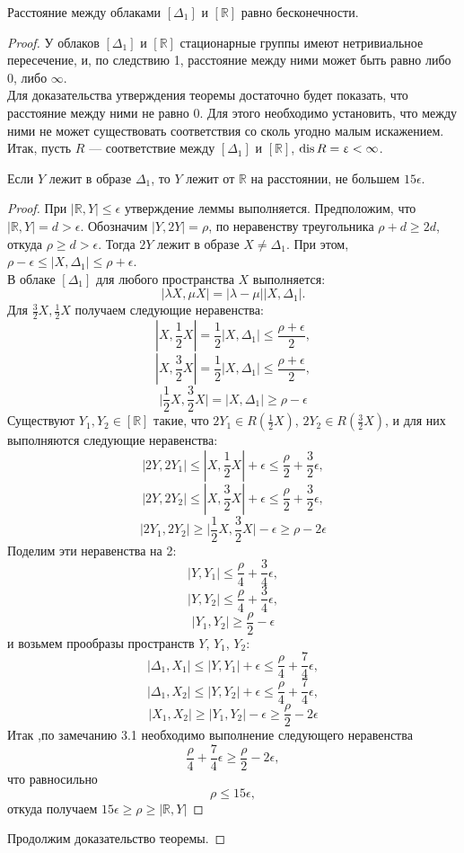 \begin{theorem}
	Расстояние между облаками $[\Delta_1]$ и $[\mathbb{R}]$ равно бесконечности.
\end{theorem} 
\begin{proof}
	У облаков $[\Delta_1]$ и $[\mathbb{R}]$ стационарные группы имеют нетривиальное пересечение, и, по следствию 1, расстояние между ними может быть равно либо $0$, либо $\infty$. \\
	Для доказательства утверждения теоремы достаточно будет показать, что расстояние между ними не равно $0$.
	Для этого необходимо установить, что между ними не может существовать соответствия со сколь угодно малым искажением. Итак, пусть $R$ --- соответствие между $[\Delta_1]$ и $[\mathbb{R}]$, $\operatorname{dis} R = \upvarepsilon < \infty$.
	
	\begin{lemma}
		Если $Y$ лежит в образе $\Delta_1$, то $Y$ лежит от $\mathbb{R} $ на расстоянии, не большем $15\epsilon$.
	\end{lemma}
	\begin{proof}
		При $|\mathbb{R}, Y| \le \epsilon$ утверждение леммы выполняется.
		Предположим, что $|\mathbb{R}, Y| = d > \epsilon$.
		Обозначим $|Y, 2Y| = \rho$, по неравенству треугольника $\rho + d \ge 2d$, откуда $\rho \ge d > \epsilon$. Тогда $2Y$ лежит в образе $X \ne \Delta_1$. При этом, $\rho - \epsilon \le |X, \Delta_1| \le \rho + \epsilon$. \\
		В облаке $[\Delta_1]$ для любого пространства $X$ выполняется:
		$$|\lambda X, \mu X| = |\lambda - \mu||X,\Delta_1|.$$
		Для $\frac{3}{2}X, \frac{1}{2}X$ получаем следующие неравенства:
		$$|X, \frac{1}{2}X| = \frac 1 2 |X, \Delta_1| \le \frac{\rho + \epsilon}{2},$$ 
		$$|X, \frac{3}{2}X| = \frac 1 2 |X, \Delta_1| \le \frac{\rho + \epsilon}{2},$$ 
		$$\big|\frac 1 2 X, \frac{3}{2}X\big| = |X, \Delta_1| \ge \rho - \epsilon$$ 
		Существуют $Y_1, Y_2 \in [\mathbb{R}]$ такие, что $2Y_1 \in R(\frac{1}{2}X)$, $2Y_2 \in R(\frac{3}{2}X)$, и для них выполняются следующие неравенства:
		$$|2Y, 2Y_{1}| \le |X, \frac{1}{2}X| + \epsilon \le \frac{\rho}{2} + \frac{3}{2}\epsilon,$$ 
		$$|2Y, 2Y_{2}| \le |X, \frac{3}{2}X| + \epsilon \le \frac{\rho}{2} + \frac{3}{2}\epsilon,$$
		$$|2Y_1, 2Y_{2}| \ge \big|\frac{1}{2}X, \frac{3}{2}X\big| - \epsilon \ge  \rho - 2\epsilon$$
		Поделим эти неравенства на 2:
		$$|Y, Y_{1}| \le \frac{\rho}{4} + \frac{3}{4}\epsilon,$$ 
		$$|Y, Y_{2}| \le \frac{\rho}{4} + \frac{3}{4}\epsilon,$$
		$$|Y_1, Y_{2}| \ge \frac{\rho}{2} - \epsilon$$ 
		\newpage
		\noindent и возьмем прообразы пространств $Y$, $Y_1$, $Y_2$:
		$$|\Delta_1, X_1| \le |Y, Y_{1}| + \epsilon \le \frac{\rho}{4} + \frac{7}{4}\epsilon,$$ 
		$$|\Delta_1, X_2| \le |Y, Y_{2}| + \epsilon \le \frac{\rho}{4} + \frac{7}{4}\epsilon,$$ 
		$$|X_1, X_2| \ge  |Y_1, Y_2| - \epsilon \ge \frac{\rho}{2} - 2\epsilon$$
		Итак ,по замечанию 3.1 необходимо выполнение следующего неравенства
		$$\frac{\rho}{4} + \frac{7}{4}\epsilon \ge \frac{\rho}{2} - 2\epsilon,$$
		что равносильно 
		$$\rho \le 15\epsilon,$$
		откуда получаем $15 \epsilon \ge \rho \ge |\mathbb{R}, Y|$
	\end{proof}
	Продолжим доказательство теоремы.


\end{proof}
